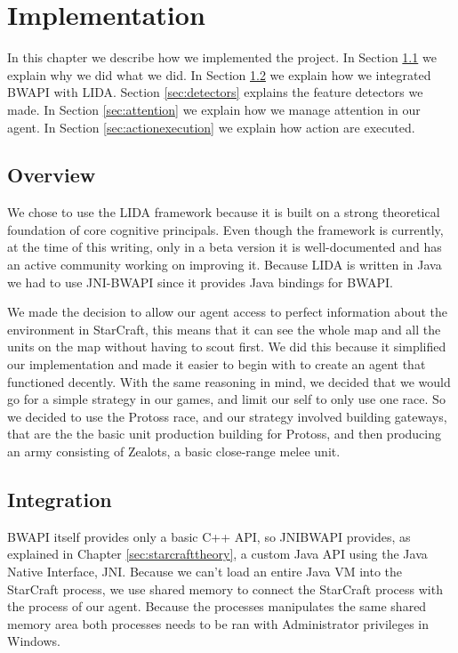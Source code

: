 
\chapter{Implementation}
In this chapter we describe how we implemented the project.
In Section \ref{sec:overview} we explain why we did what we did.
In Section \ref{sec:integration} we explain how we integrated BWAPI with LIDA.
Section \ref{sec:detectors} explains the feature detectors we made.
In Section \ref{sec:attention} we explain how we manage attention in our agent.
In Section \ref{sec:actionexecution} we explain how action are executed.

\section{Overview}
\label{sec:overview}
We chose to use the LIDA framework because it is built on a strong theoretical foundation of core cognitive principals. Even though the framework is currently, at the time of this writing, only in a beta version it is well-documented and has an active community working on improving it. Because LIDA is written in Java we had to use JNI-BWAPI since it provides Java bindings for BWAPI.

We made the decision to allow our agent access to perfect information about the environment in StarCraft, this means that it can see the whole map and all the units on the map without having to scout first. We did this because it simplified our implementation and made it easier to begin with to create an agent that functioned decently. With the same reasoning in mind, we decided that we would go for a simple strategy in our games, and limit our self to only use one race. So we decided to use the Protoss race, and our strategy involved building gateways, that are the the basic unit production building for Protoss, and then producing an army consisting of Zealots, a basic close-range melee unit.

\section{Integration}
\label{sec:integration}
BWAPI itself provides only a basic C++ API, so JNIBWAPI provides, as explained in Chapter \ref{sec:starcrafttheory}, a custom Java API using the Java Native Interface, JNI.\cite{jni} Because we can't load an entire Java VM into the StarCraft process, we use shared memory to connect the StarCraft process with the process of our agent. Because the processes manipulates the same shared memory area both processes needs to be ran with Administrator privileges in Windows.

